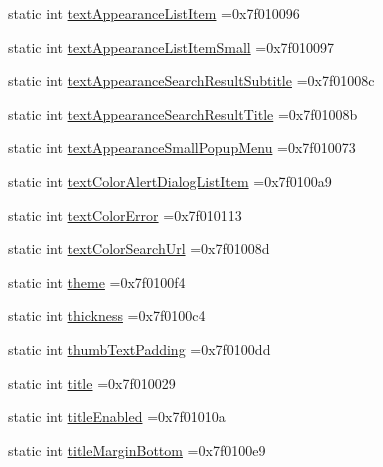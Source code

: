 \begin{DoxyCompactItemize}
static int \hyperlink{classandroid_1_1support_1_1design_1_1R_1_1attr_a8003ce7a3a860259e7e2b8dafba8d40f}{text\+Appearance\+List\+Item} =0x7f010096
\item 
static int \hyperlink{classandroid_1_1support_1_1design_1_1R_1_1attr_ab55f2b07d311017ec8b99a5a710c6a11}{text\+Appearance\+List\+Item\+Small} =0x7f010097
\item 
static int \hyperlink{classandroid_1_1support_1_1design_1_1R_1_1attr_ad4c3cf0a421f6da8cf158eb72380097d}{text\+Appearance\+Search\+Result\+Subtitle} =0x7f01008c
\item 
static int \hyperlink{classandroid_1_1support_1_1design_1_1R_1_1attr_a15f9a24fe28950f36a19a12cef2cae15}{text\+Appearance\+Search\+Result\+Title} =0x7f01008b
\item 
static int \hyperlink{classandroid_1_1support_1_1design_1_1R_1_1attr_a149652ce8ee803d221fe3d2d84235adc}{text\+Appearance\+Small\+Popup\+Menu} =0x7f010073
\item 
static int \hyperlink{classandroid_1_1support_1_1design_1_1R_1_1attr_adfa6d58ea9caa8987856e8baa586f3d4}{text\+Color\+Alert\+Dialog\+List\+Item} =0x7f0100a9
\item 
static int \hyperlink{classandroid_1_1support_1_1design_1_1R_1_1attr_afc583144784891897393a80c91d4911b}{text\+Color\+Error} =0x7f010113
\item 
static int \hyperlink{classandroid_1_1support_1_1design_1_1R_1_1attr_aa08a69e2042fd2d19b2b7adaf1fcfc8a}{text\+Color\+Search\+Url} =0x7f01008d
\item 
static int \hyperlink{classandroid_1_1support_1_1design_1_1R_1_1attr_a10605d4e34fb129fb634f376dda78853}{theme} =0x7f0100f4
\item 
static int \hyperlink{classandroid_1_1support_1_1design_1_1R_1_1attr_a7e47d9a993eb1d4446c21d067f23ea40}{thickness} =0x7f0100c4
\item 
static int \hyperlink{classandroid_1_1support_1_1design_1_1R_1_1attr_a8bbe4fd2d86639ceb48400901fef0015}{thumb\+Text\+Padding} =0x7f0100dd
\item 
static int \hyperlink{classandroid_1_1support_1_1design_1_1R_1_1attr_a1269cd6a0a69f93e03e342a0bca4f7a2}{title} =0x7f010029
\item 
static int \hyperlink{classandroid_1_1support_1_1design_1_1R_1_1attr_a67eaab883b378bf1d3a7ec621e393f22}{title\+Enabled} =0x7f01010a
\item 
static int \hyperlink{classandroid_1_1support_1_1design_1_1R_1_1attr_a2fb2f463c0477f1585632b5312aa22dc}{title\+Margin\+Bottom} =0x7f0100e9
\item 

\end{DoxyCompactItemize}
